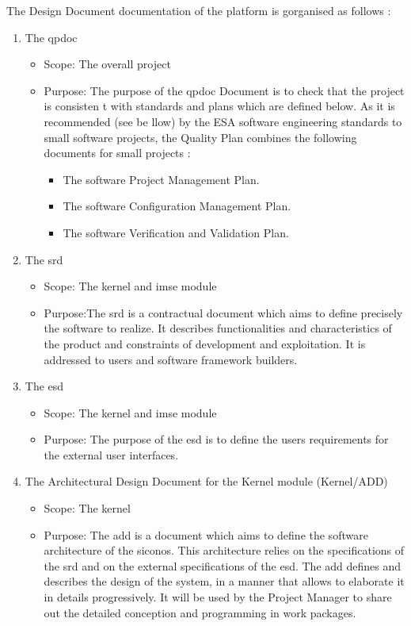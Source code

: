 

The Design Document documentation of the platform is gorganised as follows :
 \begin{enumerate}
  \item  The \acf{qpdoc}
    \begin{itemize}
    \item Scope: The overall project
    \item Purpose:  The purpose of the \ac{qpdoc} Document is to check that the project is consisten
t with standards and plans which are defined below. As it is recommended (see be
llow) by the ESA software engineering standards to small software projects, the 
Quality Plan combines the following documents for small projects :
\begin{itemize}
\item The software Project Management Plan.
\item The software Configuration Management Plan.
\item The software Verification and Validation Plan.
\end{itemize}

    \end{itemize}
  \item  The \acf{srd}
    \begin{itemize}
    \item Scope: The \ac{kernel} and \ac{imse} module
    \item Purpose:The \ac{srd} is a contractual document which aims to define precisely the software to realize. It describes functionalities and characteristics of the product and constraints of development and exploitation. It is addressed to users and software framework builders. 

    \end{itemize}
  \item  The \acf{esd}
    \begin{itemize}
    \item Scope: The \ac{kernel} and \ac{imse} module
    \item Purpose: The purpose of the \ac{esd} is to define the users requirements for the external user interfaces.
    \end{itemize}
  \item  The Architectural Design Document for the Kernel module (Kernel/ADD)
     \begin{itemize}
    \item Scope:  The \ac{kernel}
    \item Purpose: The \ac{add} is a document which aims to define the software architecture of the \ac{siconos}. This architecture relies on the specifications of the \ac{srd} and on the external specifications of the \ac{esd}.
The \ac{add} defines and describes the design of the system, in a manner that allows to elaborate it in details progressively. It will be used by the Project Manager to share out the detailed conception and programming in work packages.


\end{itemize}
\end{enumerate}
